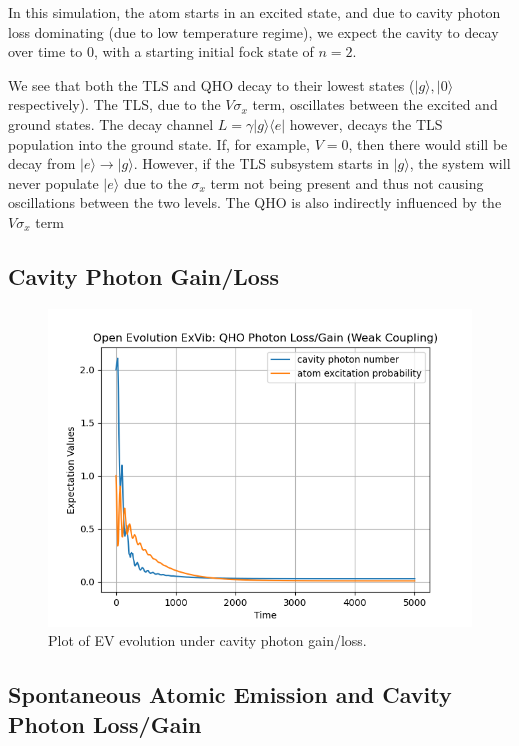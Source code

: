 \documentclass[12pt]{article}
\begin{document}
In this simulation, the atom starts in an excited state, and due to cavity photon loss dominating (due to low temperature regime), we expect the cavity to decay over time to 0, with a starting initial fock state of $n=2$.

We see that both the TLS and QHO decay to their lowest states ($|g\rangle, |0\rangle$ respectively). 
The TLS, due to the $V\sigma_x$ term, oscillates between the excited and ground states. The decay channel $L = \gamma|g\rangle\langle e|$ however, decays the TLS population into the ground state. If, for example, $V = 0$, then there would still be decay from $|e\rangle \rightarrow |g\rangle$. However, if the TLS subsystem starts in $|g\rangle$, the system will never populate $|e\rangle$ due to the $\sigma_x$ term not being present and thus not causing oscillations between the two levels. 
The QHO is also indirectly influenced by the $V\sigma_x$ term


\subsection{Cavity Photon Gain/Loss}

\begin{figure}[h]
    \centering
    \includegraphics[width=\linewidth]{Research Project/Code/results/ExVib/OQS_QHO_loss.png}
    \caption{Plot of EV evolution under cavity photon gain/loss.}
    \label{ExVib_OQS_QHO}
\end{figure}

\subsection{Spontaneous Atomic Emission and Cavity Photon Loss/Gain}
\end{document}
